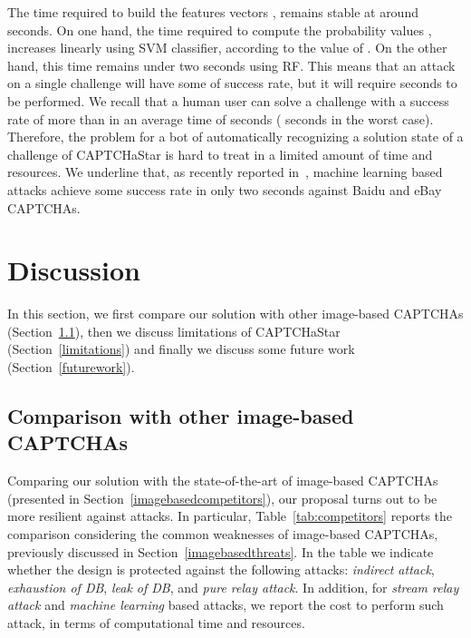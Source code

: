 \documentclass[conference]{IEEEtran}
\begin{document}
The time required to build the features vectors , remains stable at around  seconds.  
On one hand, the time required to compute the probability values , increases linearly using SVM classifier, according to the value of .
On the other hand, this time remains under two seconds using RF. This means that an attack on a single challenge will have some  of success rate, but it will require  seconds to be performed.
We recall that a human user can solve a challenge with a success rate of more than  in an average time of  seconds ( seconds in the worst case).
Therefore, the problem for a bot of automatically recognizing a solution state of a challenge of CAPTCHaStar is hard to treat in a limited amount of time and resources.
We underline that, as recently reported in~\cite{bursztein2014end}, machine learning based attacks achieve some  success rate in only two seconds against Baidu and eBay CAPTCHAs.
\newcommand*\rot{\rotatebox{90}}
\newcommand*\OK{\ding{51}}
\newcommand*\NO{\ding{55}}


\section{Discussion}
\label{discussion}
In this section, we first compare our solution with other image-based CAPTCHAs (Section~\ref{comparison}), then we discuss limitations of CAPTCHaStar (Section~\ref{limitations}) and finally we discuss some future work (Section~\ref{futurework}). 

\subsection{Comparison with other image-based CAPTCHAs }
\label{comparison}
Comparing our solution with the state-of-the-art of image-based CAPTCHAs (presented in Section~\ref{imagebasedcompetitors}), our proposal turns out to be more resilient against attacks. In particular, Table~\ref{tab:competitors} reports the comparison considering the common weaknesses of image-based CAPTCHAs, previously discussed in Section~\ref{imagebasedthreats}.
In the table we indicate whether the design is protected against the following attacks: \textit{indirect attack}, \textit{exhaustion of DB}, \textit{leak of DB}, and \textit{pure relay attack}.
In addition, for \textit{stream relay attack} and \textit{machine learning} based attacks, we report the cost to perform such attack, in terms of computational time and resources.
\end{document}
